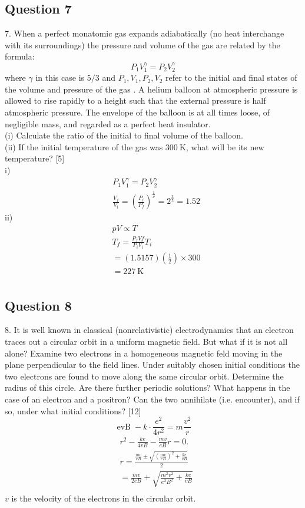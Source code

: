 \documentclass{article}
\begin{document}
\subsection{Question 7}
7. When a perfect monatomic gas expands adiabatically (no heat interchange with its surroundings) the pressure and volume of the gas are related by the formula:
$$
P_{1} V_{1}^{\gamma}=P_{2} V_{2}^{\gamma}
$$
where $\gamma$ in this case is $5 / 3$ and $P_{1}, V_{1}, P_{2}, V_{2}$ refer to the initial and final states of the volume and pressure of the gas . A helium balloon at atmospheric pressure is allowed to rise rapidly to a height such that the external pressure is half atmospheric pressure. The envelope of the balloon is at all times loose, of negligible mass, and regarded as a perfect heat insulator. \\
(i) Calculate the ratio of the initial to final volume of the balloon. \\
(ii) If the initial temperature of the gas was $300 \mathrm{~K}$, what will be its new temperature? [5] \\
i)
$$
\begin{aligned}
& P_1 V_1^\gamma=P_2 V_2^\gamma \\
& \frac{V_f}{V_i}=\left(\frac{P_i}{P_f}\right)^{\frac{1}{\nu}}=2^{\frac{3}{5}}=1.52
\end{aligned}
$$
ii)
$$
\begin{aligned}
& p V \propto T \\
& T_f=\frac{P_f V f}{P_i V_i} T_i \\
& =(1.5157)\left(\frac{1}{2}\right) \times 300 \\
& =227 \mathrm{~K} \\
&
\end{aligned}
$$
\subsection{Question 8}
8. It is well known in classical (nonrelativistic) electrodynamics that an electron traces out a circular orbit in a uniform magnetic field. But what if it is not all alone? Examine two electrons in a homogeneous magnetic feld moving in the plane perpendicular to the field lines. Under suitably chosen initial conditions the two electrons are found to move along the same circular orbit. Determine the radius of this circle. Are there further periodic solutions? What happens in the case of an electron and a positron? Can the two annihilate (i.e. encounter), and if so, under what initial conditions? [12]
$$
\operatorname{evB}-k \cdot \frac{e^2}{4 r^2}=m \frac{v^2}{r}
$$
$$
\begin{aligned}
& r^2-\frac{k e}{4 v B}-\frac{m v}{e B} r=0 . \\
& r=\frac{\frac{m v}{e B} \pm \sqrt{\left(\frac{m v}{e B}\right)^2+\frac{k e}{v B}}}{2} \\
& =\frac{m v}{2 e B}+\sqrt{\frac{m^2 v^2}{e^2 B^2}+\frac{k e}{v B}} \\
&
\end{aligned}
$$
$v$ is the velocity of the electrons in the circular orbit.\\
\end{document}
